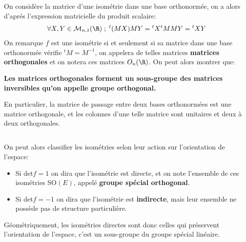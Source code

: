 \subsection*{}
On considère la matrice d'une isométrie dans une base orthonormée, on a alors d'aprés l'expression matricielle du produit scalaire:
\[
   \forall X, Y \in \mathcal{M}_{n, 1}(\R) \; ; \; {}^t(MX)MY = {}^tX{}^tMMY = {}^tXY  
\]
On remarque \(f\) est une isométrie si et seulement si sa matrice dans une base orthonormée vérifie \({}^tM = M^{-1}\), on appelera de telles matrices \textbf{matrices orthogonales} et on notera ces matrices \(O_n(\R)\).
On peut alors montrer que:
\begin{center}
   \textbf{Les matrices orthogonales forment un sous-groupe des matrices inversibles qu'on appelle groupe orthogonal.}
\end{center}
En particulier, la matrice de passage entre deux bases orthonormées est une matrice orthogonale, et les colonnes d'une telle matrice sont unitaires et deux à deux orthogonales.

\subsection*{}
On peut alors classifier les isométries selon leur action sur l'orientation de l'espace:
\begin{itemize}
   \item Si det\(f = 1\) on dira que l'isométrie est directe, et on note l'ensemble de ces isométries SO\((E)\), appelé \textbf{groupe spécial orthogonal}.
   \item Si det\(f = -1\) on dira que l'isométrie est \textbf{indirecte}, mais leur ensemble ne possède pas de structure particulière.
\end{itemize}
Géométriquement, les isométries directes sont donc celles qui préservent l'orientation de l'espace, c'est un sous-groupe du groupe spécial linéaire.
\pagebreak

